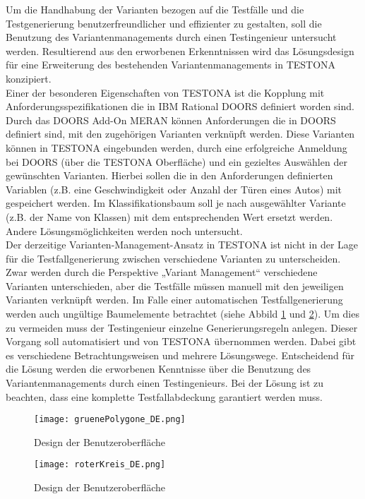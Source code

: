 Um die Handhabung der Varianten bezogen auf die Testfälle und die Testgenerierung benutzerfreundlicher und effizienter zu gestalten, soll die Benutzung des Variantenmanagements durch einen Testingenieur untersucht werden. Resultierend aus den erworbenen Erkenntnissen wird das Lösungsdesign für eine Erweiterung des bestehenden Variantenmanagements in TESTONA konzipiert.\\

Einer der besonderen Eigenschaften von TESTONA ist die Kopplung mit Anforderungsspezifikationen die in IBM Rational DOORS definiert worden sind. Durch das DOORS Add-On MERAN können Anforderungen die in DOORS definiert sind, mit den zugehörigen Varianten verknüpft werden. Diese Varianten können in TESTONA eingebunden werden, durch eine erfolgreiche Anmeldung bei DOORS (über die TESTONA Oberfläche) und ein gezieltes Auswählen der gewünschten Varianten. Hierbei sollen die in den Anforderungen definierten Variablen (z.B. eine Geschwindigkeit oder Anzahl der Türen eines Autos) mit gespeichert werden. Im Klassifikationsbaum soll je nach ausgewählter Variante (z.B. der Name von Klassen) mit dem entsprechenden Wert ersetzt werden. Andere Lösungsmöglichkeiten werden noch untersucht.\\

Der derzeitige Varianten-Management-Ansatz in TESTONA ist nicht in der Lage für die Testfallgenerierung zwischen verschiedene Varianten zu unterscheiden. Zwar werden durch die Perspektive „Variant Management“ verschiedene Varianten unterschieden, aber die Testfälle müssen manuell mit den jeweiligen Varianten verknüpft werden. Im Falle einer automatischen Testfallgenerierung werden auch ungültige Baumelemente betrachtet (siehe Abbild \ref{ttn.gruen} und \ref{ttn.rot}). Um dies zu vermeiden muss der Testingenieur einzelne Generierungsregeln anlegen. Dieser Vorgang soll automatisiert und von TESTONA übernommen werden. Dabei gibt es verschiedene Betrachtungsweisen und mehrere Lösungswege. Entscheidend für die Lösung werden die erworbenen Kenntnisse über die Benutzung des Variantenmanagements durch einen Testingenieurs. Bei der Lösung ist zu beachten, dass eine komplette Testfallabdeckung garantiert werden muss.\\


\begin{figure}[h]
  \begin{center}
    \texttt{[image: gruenePolygone\_DE.png]}
  		  \caption{Design der Benutzeroberfläche}
     \label{ttn.gruen}
  \end{center}
\end{figure}


\begin{figure}[h]
  \begin{center}
    \texttt{[image: roterKreis\_DE.png]}
  		  \caption{Design der Benutzeroberfläche}
     \label{ttn.rot}
  \end{center}
\end{figure}